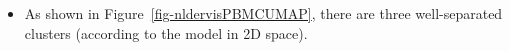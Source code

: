 \documentclass[
  12pt]{article}
\providecommand{\tightlist}{%
  \setlength{\itemsep}{0pt}\setlength{\parskip}{0pt}}\usepackage{longtable,booktabs,array}
\begin{document}
\begin{itemize}
\tightlist
\item
  As shown in Figure~\ref{fig-nldervisPBMCUMAP}, there are three
  well-separated clusters (according to the model in 2D space).
\end{itemize}

\begin{figure}[H]

\begin{minipage}[t]{0.33\linewidth}

{\centering 


}

\subcaption{\label{fig-pbmc1_sc1}}
\end{minipage}%
%
\begin{minipage}[t]{0.33\linewidth}

{\centering 

\raisebox{-\height}{

}}
\end{minipage}
\end{figure}
\end{document}
